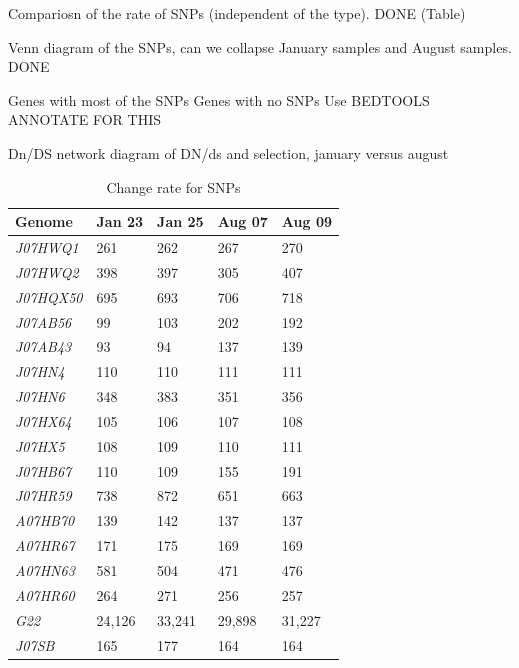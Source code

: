 Compariosn of the rate of SNPs (independent of the type). DONE (Table)

Venn diagram of the SNPs, can we collapse January samples and August samples. DONE


Genes with most of the SNPs
Genes with no SNPs 
Use BEDTOOLS ANNOTATE FOR THIS



Dn/DS
network diagram of DN/ds and selection, january versus august


\begin{table}[hbt]
  \caption{Change rate for SNPs}
  \begin{tabularx}{\textwidth}{L{2.2cm}R{2cm}R{3cm}R{3.2cm}R{2cm}}
  \hline
    \textbf{Genome} & \textbf{Jan 23} & \textbf{Jan 25} & \textbf{Aug 07} & \textbf{Aug 09} \\
    \hline
     \textit{J07HWQ1} & 261 & 262 & 267 & 270 \\
     \textit{J07HWQ2} & 398 & 397 & 305 & 407 \\
     \textit{J07HQX50} & 695 & 693 & 706 & 718 \\
     \textit{J07AB56} & 99 & 103 & 202 & 192 \\
     \textit{J07AB43} & 93 & 94 & 137 & 139 \\
     \textit{J07HN4} & 110 & 110 & 111 & 111 \\
     \textit{J07HN6} & 348 & 383 & 351 & 356 \\
     \textit{J07HX64} & 105 & 106 & 107 & 108 \\
     \textit{J07HX5} & 108 & 109 & 110 & 111 \\
     \textit{J07HB67} & 110 & 109 & 155 & 191 \\
     \textit{J07HR59} & 738 & 872 & 651 & 663 \\
     \textit{A07HB70} & 139 & 142 & 137 & 137 \\
     \textit{A07HR67} & 171 & 175 & 169 & 169 \\
     \textit{A07HN63} & 581 & 504 & 471 & 476 \\
     \textit{A07HR60} & 264 & 271 & 256 & 257 \\
     \textit{G22} & 24,126 & 33,241 & 29,898 & 31,227 \\
     \textit{J07SB} & 165 & 177 & 164 & 164 \\     
  \end{tabularx}
  \label{ChangeRate}
\end{table}

